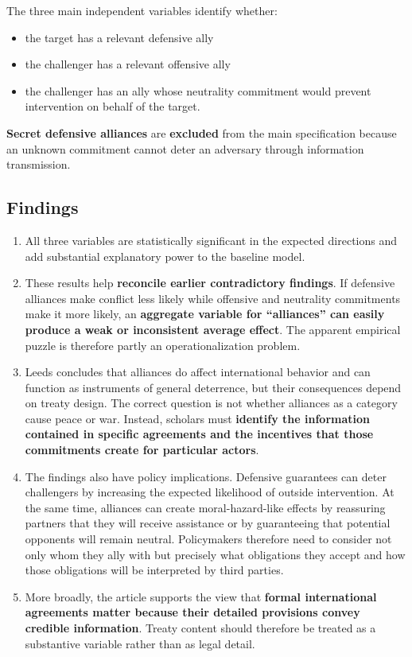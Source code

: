 The three main independent variables identify whether:
\begin{itemize}
    \item the target has a relevant defensive ally
    \item the challenger has a relevant offensive ally
    \item the challenger has an ally whose neutrality commitment would prevent intervention on behalf of the target.
\end{itemize}

\textbf{Secret defensive alliances} are \textbf{excluded} from the main specification because an unknown commitment cannot deter an adversary through information transmission.

\subsection{Findings}

\begin{enumerate}
    \item All three variables are statistically significant in the expected directions and add substantial explanatory power to the baseline model.

    \item These results help \textbf{reconcile earlier contradictory findings}. If defensive alliances make conflict less likely while offensive and neutrality commitments make it more likely, an \textbf{aggregate variable for ``alliances'' can easily produce a weak or inconsistent average effect}. The apparent empirical puzzle is therefore partly an operationalization problem.

    \item Leeds concludes that alliances do affect international behavior and can function as instruments of general deterrence, but their consequences depend on treaty design. The correct question is not whether alliances as a category cause peace or war. Instead, scholars must \textbf{identify the information contained in specific agreements and the incentives that those commitments create for particular actors}.

    \item The findings also have policy implications. Defensive guarantees can deter challengers by increasing the expected likelihood of outside intervention. At the same time, alliances can create moral-hazard-like effects by reassuring partners that they will receive assistance or by guaranteeing that potential opponents will remain neutral. Policymakers therefore need to consider not only whom they ally with but precisely what obligations they accept and how those obligations will be interpreted by third parties.

    \item More broadly, the article supports the view that \textbf{formal international agreements matter because their detailed provisions convey credible information}. Treaty content should therefore be treated as a substantive variable rather than as legal detail.
\end{enumerate}

